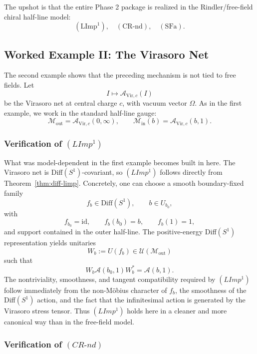 \documentclass[12pt]{article}
\theoremstyle{definition}
\theoremstyle{remark}
\begin{document}
The upshot is that the entire Phase 2 package is realized in the
Rindler/free-field chiral half-line model: \[
(\mathrm{LImp}^1),\quad
(\mathrm{CR\text{-}nd}),\quad
(\mathrm{SFa}).
\]

\subsection{Worked Example II: The Virasoro
Net}\label{worked-example-ii-the-virasoro-net}

The second example shows that the preceding mechanism is not tied to
free fields. Let \[
I\longmapsto \mathcal{A}_{\mathrm{Vir},c}(I)
\] be the Virasoro net at central charge \(c\), with vacuum vector
\(\Omega\). As in the first example, we work in the standard half-line
gauge: \[
\mathcal{M}_{\mathrm{out}}=\mathcal{A}_{\mathrm{Vir},c}(0,\infty),
\qquad
\mathcal{M}_{\mathrm{in}}(b)=\mathcal{A}_{\mathrm{Vir},c}(b,1).
\]

\subsubsection{\texorpdfstring{Verification of
\((LImp^1)\)}{Verification of (LImp\^{}1)}}\label{verification-of-limp1-1}

What was model-dependent in the first example becomes built in here. The
Virasoro net is Diff\((S^1)\)-covariant, so \((LImp^1)\) follows
directly from Theorem~\ref{thm:diff-limp}. Concretely, one can choose a
smooth boundary-fixed family \[
f_b\in\mathrm{Diff}(S^1),
\qquad
b\in U_{b_0},
\] with \[
f_{b_0}=\mathrm{id},
\qquad
f_b(b_0)=b,
\qquad
f_b(1)=1,
\] and support contained in the outer half-line. The positive-energy
Diff\((S^1)\) representation yields unitaries \[
W_b:=U(f_b)\in\mathcal{U}(\mathcal{M}_{\mathrm{out}})
\] such that \[
W_b\mathcal{A}(b_0,1)W_b^*=\mathcal{A}(b,1).
\] The nontriviality, smoothness, and tangent compatibility required by
\((LImp^1)\) follow immediately from the non-Möbius character of
\(f_b\), the smoothness of the Diff\((S^1)\) action, and the fact that
the infinitesimal action is generated by the Virasoro stress tensor.
Thus \((LImp^1)\) holds here in a cleaner and more canonical way than in
the free-field model.

\subsubsection{\texorpdfstring{Verification of
\((CR\text{-}nd)\)}{Verification of (CR\textbackslash text\{-\}nd)}}\label{verification-of-crtext-nd-1}
\end{document}
